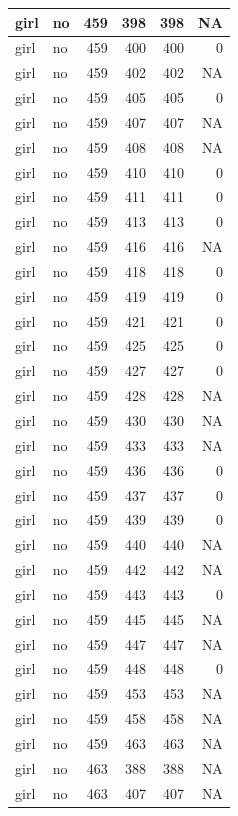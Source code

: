 \documentclass[man]{apa6}
\begin{document}
\begin{tabular}{l|l|r|r|r|r}
\hline
girl & no & 459 & 398 & 398 & NA\\
\hline
girl & no & 459 & 400 & 400 & 0\\
\hline
girl & no & 459 & 402 & 402 & NA\\
\hline
girl & no & 459 & 405 & 405 & 0\\
\hline
girl & no & 459 & 407 & 407 & NA\\
\hline
girl & no & 459 & 408 & 408 & NA\\
\hline
girl & no & 459 & 410 & 410 & 0\\
\hline
girl & no & 459 & 411 & 411 & 0\\
\hline
girl & no & 459 & 413 & 413 & 0\\
\hline
girl & no & 459 & 416 & 416 & NA\\
\hline
girl & no & 459 & 418 & 418 & 0\\
\hline
girl & no & 459 & 419 & 419 & 0\\
\hline
girl & no & 459 & 421 & 421 & 0\\
\hline
girl & no & 459 & 425 & 425 & 0\\
\hline
girl & no & 459 & 427 & 427 & 0\\
\hline
girl & no & 459 & 428 & 428 & NA\\
\hline
girl & no & 459 & 430 & 430 & NA\\
\hline
girl & no & 459 & 433 & 433 & NA\\
\hline
girl & no & 459 & 436 & 436 & 0\\
\hline
girl & no & 459 & 437 & 437 & 0\\
\hline
girl & no & 459 & 439 & 439 & 0\\
\hline
girl & no & 459 & 440 & 440 & NA\\
\hline
girl & no & 459 & 442 & 442 & NA\\
\hline
girl & no & 459 & 443 & 443 & 0\\
\hline
girl & no & 459 & 445 & 445 & NA\\
\hline
girl & no & 459 & 447 & 447 & NA\\
\hline
girl & no & 459 & 448 & 448 & 0\\
\hline
girl & no & 459 & 453 & 453 & NA\\
\hline
girl & no & 459 & 458 & 458 & NA\\
\hline
girl & no & 459 & 463 & 463 & NA\\
\hline
girl & no & 463 & 388 & 388 & NA\\
\hline
girl & no & 463 & 407 & 407 & NA\\

\end{tabular}
\end{document}
